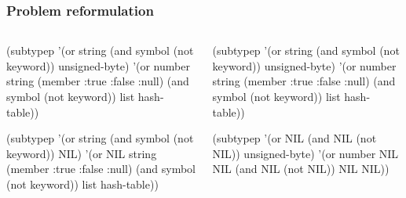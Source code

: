\documentclass[aspectratio=169]{beamer}
\newcommand\emoji[2][\tiny]{{#1#2}}
\begin{document}
\begin{frame}[fragile]
  \frametitle{Problem reformulation} %

  \begin{columns}
    \begin{mintedcodebox}[title=Litteral types splitting,compact,icon=\faQuoteLeft]
      \begin{overprint}
\begin{localcl}
(subtypep '(or string
               (and symbol
                    (not keyword))
               unsigned-byte)
          '(or number
               string
               (member :true
                       :false
                       :null)
               (and symbol
                    (not keyword))
               list
               hash-table))
\end{localcl}

\begin{localcl}
(subtypep '(or string
               (and symbol
                    (not keyword))
               NIL)
          '(or NIL
               string
               (member :true
                       :false
                       :null)
               (and symbol
                    (not keyword))
               list
               hash-table))
\end{localcl}
      \end{overprint}
    \end{mintedcodebox}

    \begin{mintedcodebox}[title=Numeric types splitting,compact,icon=\faCalculator]
      \begin{overprint}
\begin{localcl}
(subtypep '(or string
               (and symbol
                    (not keyword))
               unsigned-byte)
          '(or number
               string
               (member :true
                       :false
                       :null)
               (and symbol
                    (not keyword))
               list
               hash-table))
\end{localcl}

\begin{localcl}
(subtypep '(or NIL
               (and NIL
                    (not NIL))
               unsigned-byte)
          '(or number
               NIL
               NIL
               (and NIL
                    (not NIL))
               NIL
               NIL))
\end{localcl}
      \end{overprint}
    \end{mintedcodebox}
  \end{columns}


\end{frame}
\end{document}
